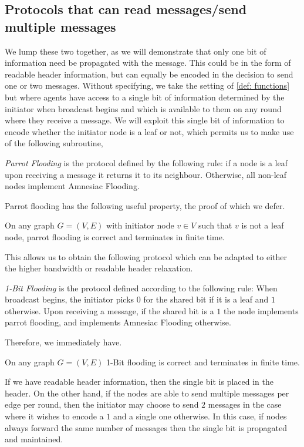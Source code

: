 \subsection{Protocols that can read messages/send multiple messages}
We lump these two together, as we will demonstrate that only one bit of information need be propagated with the message.
This could be in the form of readable header information, but can equally be encoded in the decision to send one or two messages.
Without specifying, we take the setting of \cref{def: functions} but where agents have access to a single bit of information determined by the initiator when broadcast begins and which is available to them on any round where they receive a message.
We will exploit this single bit of information to encode whether the initiator node is a leaf or not, which permits us to make use of the following subroutine,
\begin{definition}
    \emph{Parrot Flooding} is the protocol defined by the following rule: if a node is a leaf upon receiving a message it returns it to its neighbour. Otherwise, all non-leaf nodes implement Amnesiac Flooding.
\end{definition}
Parrot flooding has the following useful property, the proof of which we defer.
\begin{lemma}
    \label{lemma: parrot flooding works}
    On any graph $G=(V,E)$ with initiator node $v \in V$ such that $v$ is not a leaf node, parrot flooding is correct and terminates in finite time.
\end{lemma}
This allows us to obtain the following protocol which can be adapted to either the higher bandwidth or readable header relaxation.
\begin{definition}
    \emph{1-Bit Flooding} is the protocol defined according to the following rule: When broadcast begins, the initiator picks $0$ for the shared bit if it is a leaf and $1$ otherwise.
    Upon receiving a message, if the shared bit is a $1$ the node implements parrot flooding, and implements Amnesiac Flooding otherwise.
\end{definition}
Therefore, we immediately have.
\begin{proposition}
    On any graph $G=(V,E)$ 1-Bit flooding is correct and terminates in finite time.
\end{proposition}
If we have readable header information, then the single bit is placed in the header.
On the other hand, if the nodes are able to send multiple messages per edge per round, then the initiator may choose to send $2$ messages in the case where it wishes to encode a $1$ and a single one otherwise.
In this case, if nodes always forward the same number of messages then the single bit is propagated and maintained.\\


